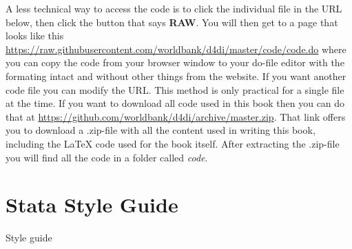 A less technical way to access the code is to click the individual file in the URL below, then click
the button that says \textbf{RAW}. You will then get to a page that looks like this
\url{https://raw.githubusercontent.com/worldbank/d4di/master/code/code.do} where you can copy the code
from your browser window to your do-file editor with the formating intact and without other things from
the website. If you want another code file you can modify the URL. This method is only practical for a 
single file at the time. If you want to download all code used in this book then you can do that at
\url{https://github.com/worldbank/d4di/archive/master.zip}. That link offers you to download a .zip-file
with all the content used in writing this book, including the \LaTeX{} code used for the book itself. After 
extracting the .zip-file you will find all the code in a folder called \textit{code}. 


\section{Stata Style Guide}

Style guide

\mainmatter
